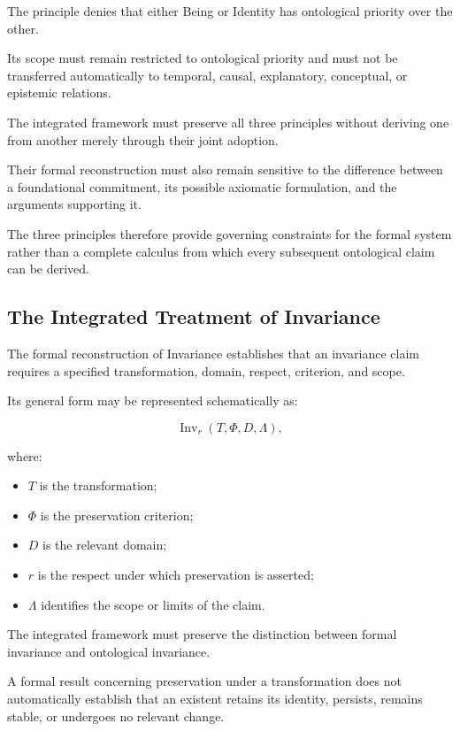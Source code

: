 The principle denies that either
Being or Identity has ontological
priority over the other.

Its scope must remain restricted
to ontological priority and
must not be transferred automatically
to temporal, causal, explanatory,
conceptual, or epistemic relations.

The integrated framework must
preserve all three principles
without deriving one from
another merely through their
joint adoption.

Their formal reconstruction
must also remain sensitive
to the difference between
a foundational commitment,
its possible axiomatic formulation,
and the arguments supporting it.

The three principles therefore
provide governing constraints
for the formal system rather
than a complete calculus
from which every subsequent
ontological claim can be derived.

\subsection{The Integrated Treatment of Invariance}

The formal reconstruction of
Invariance establishes that
an invariance claim requires
a specified transformation,
domain, respect, criterion,
and scope.

Its general form may be
represented schematically as:

\[
    \operatorname{Inv}_{r}
    (T,\Phi,D,\Lambda),
\]

where:

\begin{itemize}
    \item \(T\) is the transformation;
    \item \(\Phi\) is the preservation criterion;
    \item \(D\) is the relevant domain;
    \item \(r\) is the respect under which
    preservation is asserted;
    \item \(\Lambda\) identifies the scope
    or limits of the claim.
\end{itemize}

The integrated framework must
preserve the distinction between
formal invariance and ontological
invariance.

A formal result concerning
preservation under a transformation
does not automatically establish
that an existent retains its
identity, persists, remains stable,
or undergoes no relevant change.

